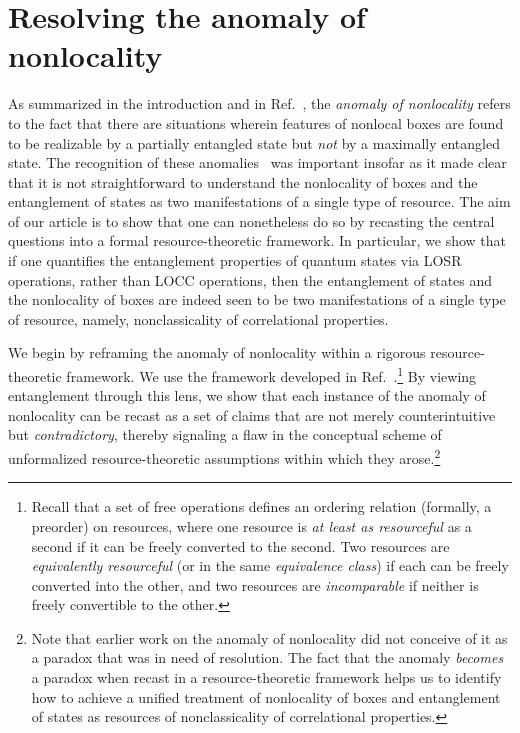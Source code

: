 \documentclass[prx,11pt,letterpaper,twocolumn,accepted=2023-11-27]{quantumarticle}
\theoremstyle{plain}
\theoremstyle{definition}
\begin{document}
\section{Resolving the anomaly of nonlocality}\label{sec:anomalies}

As summarized in the introduction and in Ref.~\cite{Methot2006anomaly}, the {\em anomaly of nonlocality} refers to the fact that there are situations wherein features of nonlocal boxes are found to be realizable by a partially entangled state but {\em not} by a maximally entangled state. 
The recognition of these anomalies~\cite{Methot2006anomaly,AnomalyExtra2005Scarani,AnomalyExtra2008Brunner,vidick2011more,AnomalyExtra2011Junge,Acin2012randomnessvsnonlocality,AnomalyExtra2014Tan,AnomalyExtra2015Augusiak,AnomalyExtra2015Fonseca,AnomalyExtra2016Bowles,AnomalyExtra2017Kabel,AnomalyExtra2018Curchod,AnomalyExtra2018Bamps,AnomalyExtra2018Chitambar,AnomalyExtra2018Lipinska,AnomalyExtra2018Barasinski} was important insofar as it made clear that it is not straightforward to understand the nonlocality of boxes and the entanglement of states as two manifestations of a single type of resource.  The aim of our article is to show that one can nonetheless do so by recasting the central questions into a  formal resource-theoretic framework.  In particular, we show that if one quantifies the entanglement properties of quantum states via LOSR operations, rather than LOCC operations, then the entanglement of states and the nonlocality of boxes are indeed seen to be two manifestations of a single type of resource, namely, nonclassicality of correlational properties. 
  


We begin by reframing the anomaly of nonlocality within a rigorous resource-theoretic framework. 
We use the framework developed in Ref.~\cite{coecke2016mathematical}.\footnote{Recall that a set of free operations defines an ordering relation (formally, a preorder) on resources, where one resource is {\em at least as resourceful} as a second if it can be freely converted to the second. Two resources are {\em equivalently resourceful} (or in the same {\em equivalence class}) if each can be freely converted into the other, and two resources are {\em incomparable} 
 if neither is freely convertible to the other. } 
By viewing entanglement through this lens, we show that each instance of the anomaly of nonlocality can be recast as a set of claims that are not merely counterintuitive but {\em contradictory}, thereby signaling a flaw in the conceptual scheme of unformalized resource-theoretic assumptions within which they arose.\footnote{Note that earlier work on the anomaly of nonlocality did not conceive of it as a paradox that was in need of resolution.   The fact that the anomaly {\em becomes} a paradox when recast in a resource-theoretic framework helps us to identify how to achieve a unified treatment of nonlocality of boxes and entanglement of states as resources of nonclassicality of correlational properties.}
\end{document}
